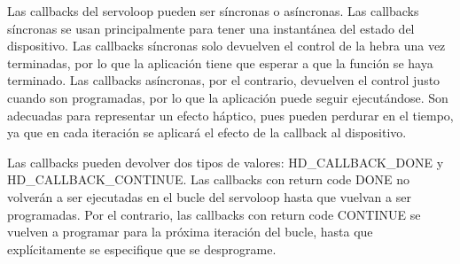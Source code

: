 \documentclass[a4paper,11pt, oneside]{book}
\begin{document}
Las callbacks del servoloop pueden ser síncronas o asíncronas. Las callbacks síncronas se usan principalmente para tener una instantánea del estado del dispositivo. Las callbacks síncronas solo devuelven el control de la hebra una vez terminadas, por lo que la aplicación tiene que esperar a que la función se haya terminado. Las callbacks asíncronas, por el contrario, devuelven el control justo cuando son programadas, por lo que la aplicación puede seguir ejecutándose. Son adecuadas para representar un efecto háptico, pues pueden perdurar en el tiempo, ya que en cada iteración se aplicará el efecto de la callback al dispositivo.

Las callbacks pueden devolver dos tipos de valores: HD\_CALLBACK\_DONE y HD\_CALLBACK\_CONTINUE. Las callbacks con return code DONE no volverán a ser ejecutadas en el bucle del servoloop hasta que vuelvan a ser programadas. Por el contrario, las callbacks con return code CONTINUE se vuelven a programar para la próxima iteración del bucle, hasta que explícitamente se especifique que se desprograme.
\end{document}
